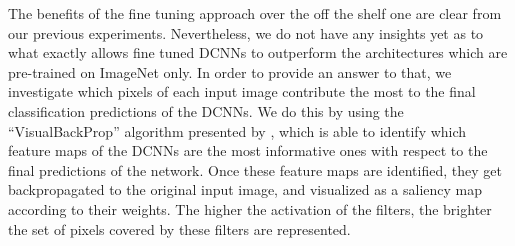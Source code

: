 \documentclass[runningheads]{llncs}
\begin{document}
The benefits of the fine tuning approach over the off the shelf one are clear from our previous experiments. Nevertheless, we do not have any insights yet as to what exactly allows fine tuned DCNNs to outperform the architectures which are pre-trained on ImageNet only. In order to provide an answer to that, we investigate which pixels of each input image contribute the most to the final classification predictions of the DCNNs. We do this by using the ``VisualBackProp'' algorithm presented by \cite{bojarski2016visualbackprop}, which is able to identify which feature maps of the DCNNs are the most informative ones with respect to the final predictions of the network. Once these feature maps are identified, they get backpropagated to the original input image, and visualized as a saliency map according to their weights. The higher the activation of the filters, the brighter the set of pixels covered by these filters are represented.
\end{document}
